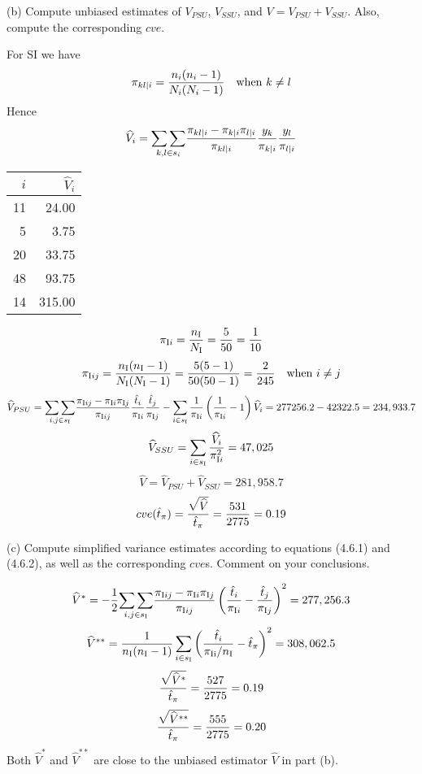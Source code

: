 \documentclass[12pt]{article}
\begin{document}
(b) Compute unbiased estimates of $V_{PSU}$, $V_{SSU}$, and
$V=V_{PSU}+V_{SSU}$.
Also, compute the corresponding $cve$.

For SI we have
\[
\pi_{kl\mid i}={n_i(n_i-1)\over N_i(N_i-1)}\quad\hbox{when $k\ne l$}
\]
Hence
\[
\widehat V_i=\underset{k,l\in s_i}{\sum\sum}{\pi_{kl\mid i}-\pi_{k\mid i}\pi_{l\mid i}
\over\pi_{kl\mid i}}{y_k\over\pi_{k\mid i}}{y_l\over\pi_{l\mid i}}
\]
\begin{center}
\begin{tabular}{|r|r|}
\hline
$i$ & $\widehat V_i$\\
\hline
11 & 24.00\\
5 & 3.75\\
20 & 33.75\\
48 & 93.75\\
14 & 315.00\\
\hline
\end{tabular}
\end{center}
%
\[
\pi_{\mathrm Ii}={n_{\rm I}\over N_{\rm I}}={5\over50}={1\over10}
\]
\[
\pi_{\mathrm Iij}={n_{\rm I}(n_{\rm I}-1)\over N_{\rm I}(N_{\rm I}-1)}
={5(5-1)\over 50(50-1)}={2\over245}\quad\hbox{when $i\ne j$}
\]
\[
\widehat V_{PSU}=\underset{i,j\in s_{\rm I}}{\sum\sum}
{\pi_{\mathrm Iij}-\pi_{\mathrm Ii}\pi_{\mathrm Ij}
\over\pi_{\mathrm Iij}}
{\hat t_i\over\pi_{\mathrm Ii}}
{\hat t_j\over\pi_{\mathrm Ij}}
-\sum_{i\in s_{\rm I}}{1\over\pi_{\mathrm Ii}}
\left({1\over\pi_{\mathrm Ii}}-1\right)\widehat V_i
=277256.2-42322.5=234,933.7
\]
\[
\widehat V_{SSU}=\sum_{i\in s_{\rm I}}{\widehat V_i\over\pi_{\mathrm Ii}^2}=47,025
\]
\[
\widehat V=\widehat V_{PSU}+\widehat V_{SSU}=281,958.7
\]
\[
cve(\hat t_\pi)={\sqrt{\widehat V}\over\hat t_\pi}={531\over2775}=0.19
\]

(c) Compute simplified variance estimates according to equations (4.6.1)
and (4.6.2), as well as the corresponding $cve$s.
Comment on your conclusions.

\[
\widehat V^*=-{1\over2}\underset{i,j\in s_{\rm I}}{\sum\sum}
{\pi_{\mathrm Iij}-\pi_{\mathrm Ii}\pi_{\mathrm Ij}
\over\pi_{\mathrm Iij}}
\left({\hat t_i\over\pi_{\mathrm Ii}}-{\hat t_j\over\pi_{\mathrm Ij}}\right)^2
=277,256.3
\]
%
\[
\widehat V^{**}={1\over n_{\rm I}(n_{\rm I}-1)}\sum_{i\in s_{\rm I}}
\left({\hat t_i\over\pi_{\rm Ii}/n_{\rm I}}-\hat t_\pi\right)^2=308,062.5
\]
%
\[
{\sqrt{\widehat V^*}\over\hat t_\pi}={527\over2775}=0.19
\]
%
\[
{\sqrt{\widehat V^{**}}\over\hat t_\pi}={555\over2775}=0.20
\]
Both $\widehat V^*$ and $\widehat V^{**}$ are close to the unbiased estimator
$\widehat V$ in part (b).
\end{document}
